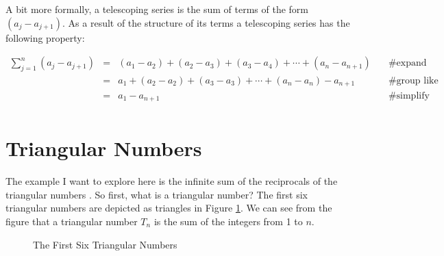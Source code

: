 \documentclass{article}
\theoremstyle{definition}
\begin{document}
\bigskip
\noindent
A bit more formally, a telescoping series is the sum of terms of
the form $(a_j - a_{j+1})$. As a result of the structure of its
terms a telescoping series has the following property:

\begin{equation*}
\begin{array}{lllll}
{\displaystyle \sum\limits_{j = 1}^{n} (a_{j} - a_{j+1})}
&=&  (a_1 - a_2) + (a_2 - a_3) + (a_3 - a_4) + \cdots + (a_n - a_{n+1})
			&\quad \mathrel{\#} \text{expand terms} \\
[12pt]
&=& a_1 + (a_2 - a_2) + (a_3 - a_3) + \cdots + (a_n - a_n) - a_{n+1}
			&\quad \mathrel{\#} \text{group like terms} \\
[12pt]
&=& a_1 - a_{n+1}                                                               
			&\quad \mathrel{\#} \text{simplify} \\
\end{array}
\end{equation*}

\smallskip
\section{Triangular Numbers}
The example I want to explore here is the infinite sum of the
reciprocals of the triangular numbers \cite{wiki:triangle_numbers}.  
So first, what is a triangular number? The first six triangular 
numbers are depicted as triangles in Figure \ref{fig:triangle_numbers}. 
We can see from the figure that a triangular number $T_n$ is the sum 
of the integers from 1 to $n$.
  
\bigskip
\begin{figure}[H]
\caption{The First Six Triangular Numbers \cite{wiki:triangle_numbers}}
\label{fig:triangle_numbers}
\end{figure}
\end{document}
